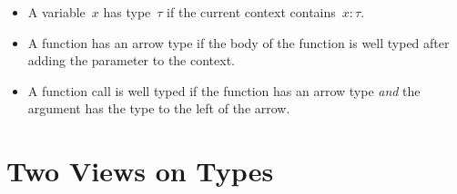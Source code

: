 \documentclass{lecturenotes}
\newcommand{\abs}[2]{\ensuremath{\lambda #1.\,#2}}
\newcommand{\app}[2]{\ensuremath{#1\;#2}}
\begin{document}

\begin{itemize}
\item A variable~$x$ has type~$\tau$ if the current context contains~$x \colon \tau$.
\item A function has an arrow type if the body of the function is well typed after adding the parameter to the context.
\item A function call is well typed if the function has an arrow type \emph{and} the argument has the type to the left of the arrow.
\end{itemize}

\section{Two Views on Types}
\label{sec:two-views-types}
\end{document}
